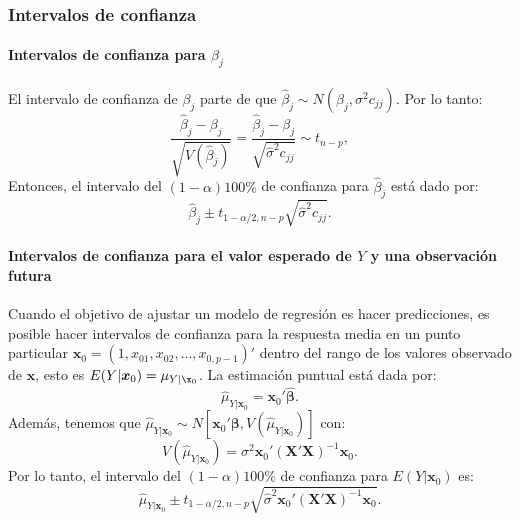 \documentclass[
]{article}
\begin{document}
\subsubsection{Intervalos de confianza}\label{intervalos-de-confianza}

\paragraph{\texorpdfstring{Intervalos de confianza para \(\beta_{j}\)}{Intervalos de confianza para \textbackslash beta\_\{j\}}}\label{intervalos-de-confianza-para-beta_j}

El intervalo de confianza de \(\beta_{j}\) parte de que \(\widehat{\beta}_j \sim N(\beta_j,\sigma^2 c_{jj})\). Por lo tanto:
\[
\frac{\widehat{\beta}_{j} - \beta_{j}}{\sqrt{V(\widehat{\beta}_{j})}} =  \frac{\widehat{\beta}_{j} - \beta_{j}}{\sqrt{\widehat{\sigma}^2 c_{jj}}} \sim t_{n-p},
\]
Entonces, el intervalo del \((1-\alpha)100\%\) de confianza para \(\widehat{\beta}_{j}\) está dado por:
\[
\widehat{\beta}_{j} \pm t_{1-\alpha/2,n-p}\sqrt{\widehat{\sigma}^2 c_{jj}}.
\]

\paragraph{\texorpdfstring{Intervalos de confianza para el valor esperado de \(Y\) y una observación futura}{Intervalos de confianza para el valor esperado de Y y una observación futura}}\label{intervalos-de-confianza-para-el-valor-esperado-de-y-y-una-observaciuxf3n-futura}

Cuando el objetivo de ajustar un modelo de regresión es hacer predicciones, es posible hacer intervalos de confianza para la respuesta media en un punto particular \(\boldsymbol x_{0}=(1,x_{01},x_{02},\ldots,x_{0,p-1})'\) dentro del rango de los valores observado de \(\boldsymbol x\), esto es \(E(Y|\boldsymbol x_{0})=\mu_{Y|\x_{0}}\). La estimación puntual está dada por:
\[
\widehat{\mu}_{Y|\boldsymbol x_0} = \boldsymbol x_{0}'\widehat{\boldsymbol \beta}.
\]
Además, tenemos que \(\widehat{\mu}_{Y|\boldsymbol x_0} \sim N[\boldsymbol x_{0}'\boldsymbol \beta, V(\widehat{\mu}_{Y|\boldsymbol x_0})]\) con:
\[
V(\widehat{\mu}_{Y|\boldsymbol x_0}) = \sigma^{2}\boldsymbol x_{0}'(\boldsymbol X'\boldsymbol X)^{-1}\boldsymbol x_{0}.
\]
Por lo tanto, el intervalo del \((1-\alpha)100\%\) de confianza para \(E(Y|\boldsymbol x_{0})\) es:
\[
\widehat{\mu}_{Y|\boldsymbol x_0} \pm t_{1-\alpha/2,n-p}\sqrt{\widehat{\sigma}^2 \boldsymbol x_{0}'(\boldsymbol X'\boldsymbol X)^{-1}\boldsymbol x_{0}}.
\]
\end{document}
